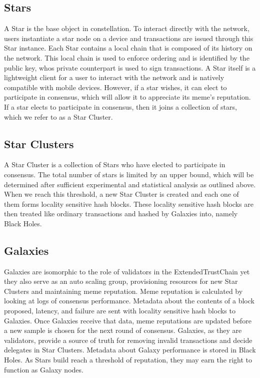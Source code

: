 \documentclass{article}
\begin{document}
\subsection{Stars}
A Star is the base object in constellation. To interact directly with the network, users instantiate a star node on a device and transactions are issued through this Star instance. Each Star contains a local chain that is composed of its history on the network. This local chain is used to enforce ordering and is identified by the public key, whos private counterpart is used to sign transactions. A Star itself is a lightweight client for a user to interact with the network and is natively compatible with mobile devices. However, if a star wishes, it can elect to participate in consensus, which will allow it to appreciate its meme's reputation. If a star elects to participate in consensus, then it joins a collection of stars, which we refer to as a Star Cluster.

\subsection{Star Clusters}
A Star Cluster is a collection of Stars who have elected to participate in consensus. The total number of stars is limited by an upper bound, which will be determined after sufficient experimental and statistical analysis as outlined above. When we reach this threshold, a new Star Cluster is created and each one of them forms locality sensitive hash blocks. These locality sensitive hash blocks are then treated like ordinary transactions and hashed by Galaxies into, namely Black Holes.

\subsection{Galaxies}
Galaxies are isomorphic to the role of validators in the ExtendedTrustChain yet they also serve as an auto scaling group, provisioning resources for new Star Clusters and maintaining meme reputation. Meme reputation is calculated by looking at logs of consensus performance. Metadata about the contents of a block proposed, latency, and failure are sent with locality sensitive hash blocks to Galaxies. Once Galaxies receive that data, meme reputations are updated before a new sample is chosen for the next round of consensus. Galaxies, as they are validators, provide a source of truth for removing invalid transactions and decide delegates in Star Clusters. Metadata about Galaxy performance is stored in Black Holes. As Stars build reach a threshold of reputation, they may earn the right to function as Galaxy nodes.
\end{document}
